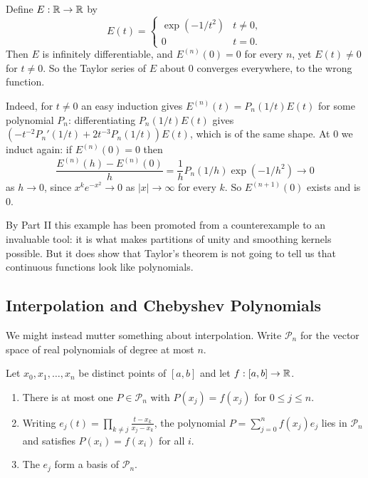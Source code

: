 \documentclass[a4paper]{scrartcl}
\newcommand{\Pn}{\mathcal{P}}
\begin{document}
\begin{example}\label{ex:cauchy}
	Define $E : \mathbb{R}\to\mathbb{R}$ by
	$$E(t) = \begin{cases} \exp(-1/t^2) & t\neq 0,\\ 0 & t=0.\end{cases}$$
	Then $E$ is infinitely differentiable, and $E^{(n)}(0)=0$ for every $n$, yet $E(t)\neq 0$ for $t \neq 0$. So the Taylor series of $E$ about $0$ converges everywhere, to the wrong function.

	Indeed, for $t\neq 0$ an easy induction gives $E^{(n)}(t) = P_n(1/t)E(t)$ for some polynomial $P_n$: differentiating $P_n(1/t)E(t)$ gives $\left(-t^{-2}P_n'(1/t) + 2t^{-3}P_n(1/t)\right)E(t)$, which is of the same shape. At $0$ we induct again: if $E^{(n)}(0)=0$ then
	$$\frac{E^{(n)}(h)-E^{(n)}(0)}{h} = \frac1h P_n(1/h)\exp(-1/h^2) \to 0$$
	as $h\to 0$, since $x^k e^{-x^2}\to 0$ as $|x|\to\infty$ for every $k$. So $E^{(n+1)}(0)$ exists and is $0$.
\end{example}

By Part II this example has been promoted from a counterexample to an invaluable tool: it is what makes partitions of unity and smoothing kernels possible. But it does show that Taylor's theorem is not going to tell us that continuous functions look like polynomials.

\subsection{Interpolation and Chebyshev Polynomials}

We might instead mutter something about interpolation. Write $\Pn_n$ for the vector space of real polynomials of degree at most $n$.

\begin{lemma}\label{lem:lagrange}
	Let $x_0,x_1,\ldots,x_n$ be distinct points of $[a,b]$ and let $f : [a,b] \to\mathbb{R}$.
	\begin{enumerate}[label=(\roman*)]
		\item There is at most one $P \in \Pn_n$ with $P(x_j) = f(x_j)$ for $0\leq j\leq n$.
		\item Writing $e_j(t) = \prod_{k\neq j}\frac{t-x_k}{x_j-x_k}$, the polynomial $P = \sum_{j=0}^n f(x_j)e_j$ lies in $\Pn_n$ and satisfies $P(x_i)=f(x_i)$ for all $i$.
		\item The $e_j$ form a basis of $\Pn_n$.
	\end{enumerate}
\end{lemma}
\end{document}
